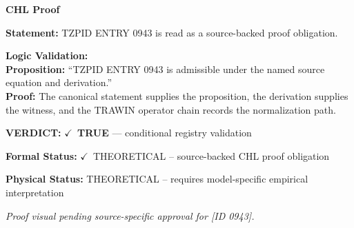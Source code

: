 \vspace{0.45em}
\noindent\textbf{CHL Proof}\par
\textbf{Statement:} TZPID ENTRY 0943 is read as a source-backed proof obligation.

\textbf{Logic Validation:}\\
\textbf{Proposition:} ``TZPID ENTRY 0943 is admissible under the named source equation and derivation.''\\
\textbf{Proof:} The canonical statement supplies the proposition, the derivation supplies the witness, and the TRAWIN operator chain records the normalization path.

\textbf{VERDICT:} \ensuremath{\checkmark}\ \textbf{TRUE} --- conditional registry validation

\textbf{Formal Status:} \ensuremath{\checkmark}\ THEORETICAL -- source-backed CHL proof obligation

\textbf{Physical Status:} THEORETICAL -- requires model-specific empirical interpretation
\par\vspace{0.45em}
\par
\vfill
\begingroup\footnotesize\itshape
Proof visual pending source-specific approval for [ID 0943].
\par\endgroup
\vfill
\endgroup
\endgroup
